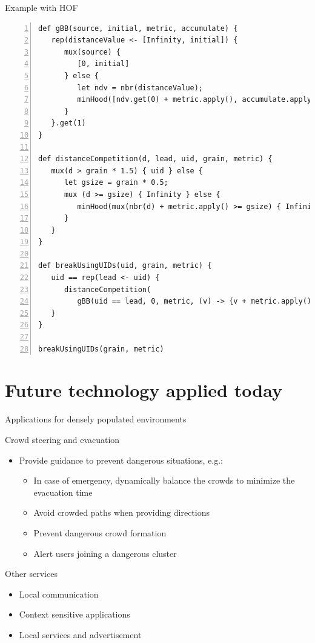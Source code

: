 \documentclass[presentation]{beamer}\mode<presentation>{\usetheme{sapere}}
\begin{document}
\begin{frame}[fragile]{Example with HOF}
    \tiny
    \begin{lstlisting}[mathescape,morekeywords={rep,mux,sense,inf,def,min,hood,nbr,nbr,range,else,if,Infinity},numbers=left,basicstyle=\ttfamily]
def gBB(source, initial, metric, accumulate) {
   rep(distanceValue <- [Infinity, initial]) {
      mux(source) {
         [0, initial]
      } else {
         let ndv = nbr(distanceValue);
         minHood([ndv.get(0) + metric.apply(), accumulate.apply(ndv.get(1))])
      }
   }.get(1)
}

def distanceCompetition(d, lead, uid, grain, metric) {
   mux(d > grain * 1.5) { uid } else {
      let gsize = grain * 0.5;
      mux (d >= gsize) { Infinity } else {
         minHood(mux(nbr(d) + metric.apply() >= gsize) { Infinity } else { nbr(lead) })
      }
   }
}

def breakUsingUIDs(uid, grain, metric) {
   uid == rep(lead <- uid) {
      distanceCompetition(
         gBB(uid == lead, 0, metric, (v) -> {v + metric.apply()}), lead, uid, grain, metric)
   }
}

breakUsingUIDs(grain, metric)
    \end{lstlisting}
\end{frame}



\section{Future technology applied today}

\begin{frame}{Applications for densely populated environments}
  \begin{block}{Crowd steering and evacuation}
    \begin{itemize}
     \item Provide guidance to prevent dangerous situations, e.g.:
      \begin{itemize}
      \item In case of emergency, dynamically balance the crowds to minimize the evacuation time
      \item Avoid crowded paths when providing directions
      \item Prevent dangerous crowd formation
      \item Alert users joining a dangerous cluster
      \end{itemize}
    \end{itemize}
  \end{block}
  \begin{block}{Other services}
    \begin{itemize}
     \item Local communication
     \item Context sensitive applications
     \item Local services and advertisement
    \end{itemize}
  \end{block}
\end{frame}
\end{document}
